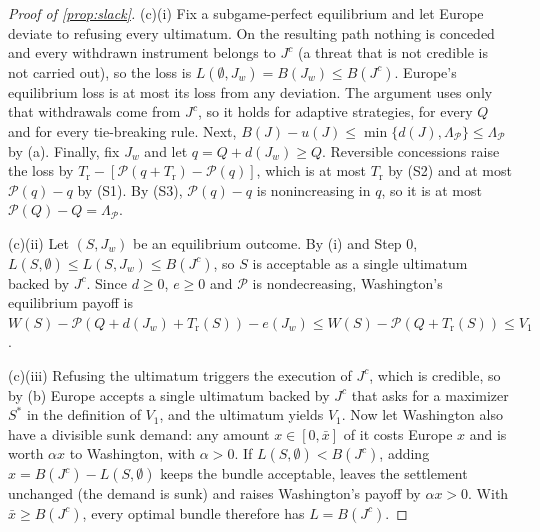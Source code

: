 \begin{proof}[Proof of \cref{prop:slack}]
(c)(i) Fix a subgame-perfect equilibrium and let Europe deviate to refusing every ultimatum. On the resulting path nothing is conceded and every withdrawn instrument belongs to $J^c$ (a threat that is not credible is not carried out), so the loss is $L(\emptyset,J_w)=B(J_w)\le B(J^c)$. Europe's equilibrium loss is at most its loss from any deviation. The argument uses only that withdrawals come from $J^c$, so it holds for adaptive strategies, for every $Q$ and for every tie-breaking rule. Next, $B(J)-u(J)\le\min\{d(J),\Lambda_{\mathcal P}\}\le\Lambda_{\mathcal P}$ by (a). Finally, fix $J_w$ and let $q=Q+d(J_w)\ge Q$. Reversible concessions raise the loss by $T_{\mathrm r}-[\mathcal P(q+T_{\mathrm r})-\mathcal P(q)]$, which is at most $T_{\mathrm r}$ by (S2) and at most $\mathcal P(q)-q$ by (S1). By (S3), $\mathcal P(q)-q$ is nonincreasing in $q$, so it is at most $\mathcal P(Q)-Q=\Lambda_{\mathcal P}$.

(c)(ii) Let $(S,J_w)$ be an equilibrium outcome. By (i) and Step 0, $L(S,\emptyset)\le L(S,J_w)\le B(J^c)$, so $S$ is acceptable as a single ultimatum backed by $J^c$. Since $d\ge 0$, $e\ge 0$ and $\mathcal P$ is nondecreasing, Washington's equilibrium payoff is $W(S)-\mathcal P(Q+d(J_w)+T_{\mathrm r}(S))-e(J_w)\le W(S)-\mathcal P(Q+T_{\mathrm r}(S))\le V_1$.

(c)(iii) Refusing the ultimatum triggers the execution of $J^c$, which is credible, so by (b) Europe accepts a single ultimatum backed by $J^c$ that asks for a maximizer $S^*$ in the definition of $V_1$, and the ultimatum yields $V_1$. Now let Washington also have a divisible sunk demand: any amount $x\in[0,\bar x]$ of it costs Europe $x$ and is worth $\alpha x$ to Washington, with $\alpha>0$. If $L(S,\emptyset)<B(J^c)$, adding $x=B(J^c)-L(S,\emptyset)$ keeps the bundle acceptable, leaves the settlement unchanged (the demand is sunk) and raises Washington's payoff by $\alpha x>0$. With $\bar x\ge B(J^c)$, every optimal bundle therefore has $L=B(J^c)$.


\end{proof}

